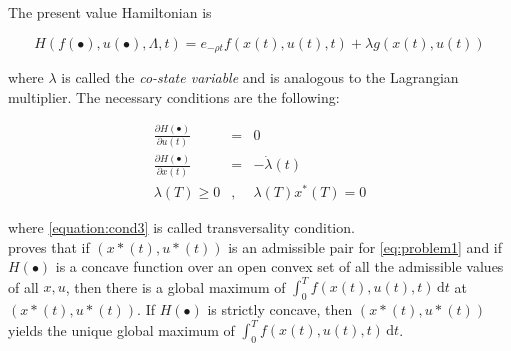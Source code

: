 The present value Hamiltonian is

\begin{equation}
H(f(\bullet), u(\bullet), \Lambda, t) = e_{- \rho t} f(x(t), u(t),t) + \lambda g(x(t),u(t))
\end{equation}

\noindent where $\lambda$ is called the \textit{co-state variable} and is analogous to the Lagrangian multiplier. The necessary conditions are the following:

\begin{eqnarray}
\frac{\partial H(\bullet)}{\partial u(t)} &=& 0 \nonumber \\ 
\frac{\partial H(\bullet)}{\partial x(t)} &=& -\dot{\lambda}(t) \nonumber  \\
\lambda (T) \geq 0 &,& \lambda (T) x^*(T) = 0 \label{equation:cond3}
\end{eqnarray}

\noindent where \eqref{equation:cond3} is called transversality condition.\\
\indent \citep {mangasarian1966sufficient} proves that if $(x*(t),u*(t))$ is an admissible pair for \eqref{eq:problem1} and if $ H(\bullet)$  is a concave function over an open convex set of all the admissible values of  all $x, u$, then there is a global maximum of $ \int_0^T \! f(x(t),u(t),t) \, \mathrm{d}t$ at $(x*(t),u*(t))$. If $ H(\bullet)$ is strictly concave, then $(x*(t),u*(t))$  yields the unique global maximum of  $ \int_0^T \! f(x(t),u(t),t) \, \mathrm{d}t$.
